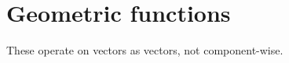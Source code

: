 \hypertarget{group__core__func__geometric}{\section{\-Geometric functions}
\label{group__core__func__geometric}
}
\-These operate on vectors as vectors, not component-\/wise. 